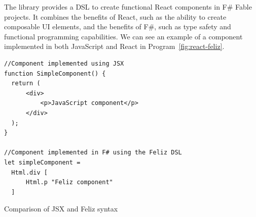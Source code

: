 The \citet{feliz} library provides a DSL to create functional React components in F\# Fable projects.
It combines the benefits of React, such as the ability to create composable UI elements, and the benefits of F\#, such as type safety and functional programming capabilities.
We can see an example of a component implemented in both JavaScript and React in Program~\ref{fig:react-feliz}.
\begin{listing}
	\begin{center}
		\begin{lstlisting}
//Component implemented using JSX
function SimpleComponent() {
  return (
      <div>
          <p>JavaScript component</p>
      </div>
  );
} 

//Component implemented in F# using the Feliz DSL
let simpleComponent = 
  Html.div [
      Html.p "Feliz component"
  ]
  \end{lstlisting}
	\end{center}
	\caption{Comparison of JSX and Feliz syntax}
	\label{fig:react-feliz}
\end{listing}

